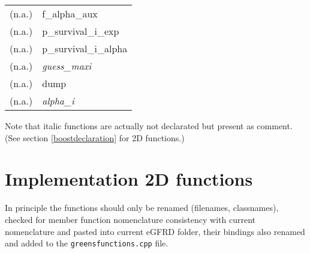 \documentclass[a4paper,10pt]{article}
\begin{document}
\begin{table}[h!]
\begin{tabular}{ p{} p{} }
    (n.a.) & f\_alpha\_aux \\

    (n.a.) & p\_survival\_i\_exp \\
    (n.a.) & p\_survival\_i\_alpha \\

    (n.a.) & \textit{guess\_maxi} \\ \hline
    (n.a.) & dump \\
    (n.a.) & \textit{alpha\_i} \\
  
\end{tabular}

\bigskip 

Note that italic functions are actually not declarated but present as comment. (See section \ref{boostdeclaration} for 2D functions.)
\end{table}

\section{Implementation 2D functions}

In principle the functions should only be renamed (filenames, classnames), checked for member function nomenclature consistency with current nomenclature and pasted into current eGFRD folder, their bindings also renamed and added to the \texttt{greensfunctions.cpp} file.
\end{document}
